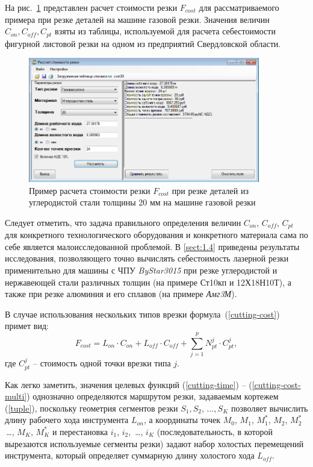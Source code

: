 \documentclass[11pt,twoside,openany]{report}
\begin{document}
На рис.~\ref{cost} представлен расчет стоимости резки
$F_{cost}$
для рассматриваемого примера при резке деталей на машине газовой резки.
Значения величин
$C_{on}, C_{off}, C_{pt}$
взяты из таблицы, используемой для расчета себестоимости фигурной
листовой резки на одном из предприятий Свердловской области.

\begin{figure}[h]
  \begin{center}
  \includegraphics[width=0.9\textwidth]{cost.png}
  \caption{
    Пример расчета стоимости резки $F_{cost}$
    при резке деталей из углеродистой стали
    толщины 20 мм на машине газовой резки}
  \label{cost}
  \end{center}
\end{figure}

Следует отметить,
что задача правильного определения величин
$C_{on}$, $C_{off}$, $C_{pt}$
для конкретного технологического оборудования
и конкретного материала сама по себе является малоисследованной проблемой.
В \ref{sect:1.4}
приведены результаты исследования,
позволяющего точно вычислять себестоимость
лазерной резки применительно для машины с ЧПУ
\textit{ByStar3015}
при резке углеродистой и нержавеющей
стали различных толщин
(на примере Ст10кп и 12Х18Н10Т),
а также при резке алюминия и его сплавов
(на примере \textit{Амг3М}).

В случае использования нескольких типов врезки формула~(\ref{cutting-cost}) примет вид:
\begin{equation}
  F_{cost}=
  L_{on} \cdot C_{on} +
  L_{off} \cdot C_{off} +
  \sum_{j=1}^p N_{pt}^j \cdot C_{pt}^j
  ,
  \label{cutting-cost-multi}
\end{equation}
где $C_{pt}^j$ -- стоимость одной точки врезки типа $j$.

Как легко заметить,
значения целевых функций (\ref{cutting-time}) -- (\ref{cutting-cost-multi})
однозначно определяются маршрутом резки,
задаваемым кортежем (\ref{tuple}),
поскольку геометрия сегментов резки
$S_1, S_2, \,\dots, S_K$
позволяет вычислить длину рабочего хода инструмента  $L_{on}$,
а координаты точек
$M_0$, $M_1$, $M_1^*$, $M_2$, $M_2^*$ \,\dots, $M_K$, $M_K^*$
и перестановка
$i_1$, $i_2$, \,\dots, $i_K$
(последовательность, в которой вырезаются используемые сегменты резки)
задают набор холостых перемещений инструмента,
который определяет суммарную длину холостого хода
$L_{off}$.
\end{document}
